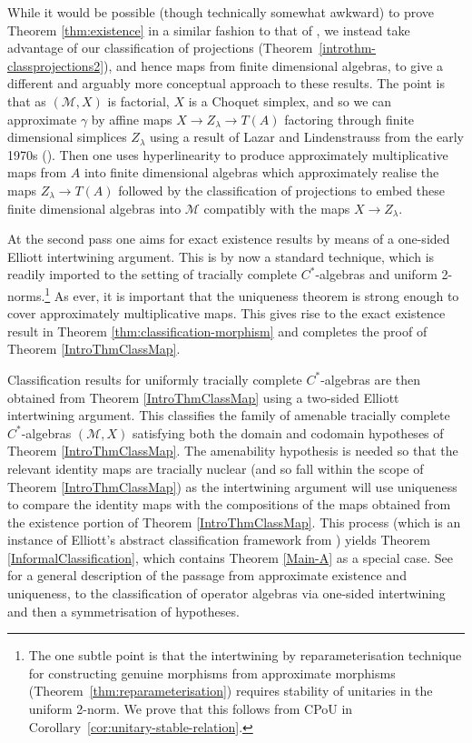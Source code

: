 \documentclass[a4paper,11pt]{amsart}
\theoremstyle{definition}
\numberwithin{equation}{section}
\numberwithin{theorem}{section}
\newcommand{\M}{\mathcal{M}}
\begin{document}
While it would be possible (though technically somewhat awkward) to prove Theorem \ref{thm:existence} in a similar fashion to that of \cite[Theorem 2.6]{CETW-classification}, we instead take advantage of our classification of projections (Theorem~\ref{introthm-classprojections2}), and hence maps from finite dimensional algebras, 
to give a different and arguably more conceptual approach to these results.  The point is that as $(\M,X)$ is factorial, $X$ is a Choquet simplex, and so we can approximate $\gamma$ by affine maps $X\to Z_\lambda \to T(A)$ factoring through finite dimensional simplices $Z_\lambda$ using a result of Lazar and Lindenstrauss from the early 1970s (\cite{Lazar-Lindenstrauss71}).  Then one uses hyperlinearity to produce approximately multiplicative maps from $A$ into finite dimensional algebras which approximately realise the maps $Z_\lambda \to T(A)$ followed by the classification of projections to embed these finite dimensional algebras into $\M$ compatibly with the maps $X\to Z_\lambda$. 

At the second pass one aims for exact existence results by means of a one-sided Elliott intertwining argument. This is by now a standard technique, which is readily imported to the setting of tracially complete $C^*$-algebras and uniform 2-norms.\footnote{The one subtle point is that the intertwining by reparameterisation technique for constructing genuine morphisms from approximate morphisms (Theorem~\ref{thm:reparameterisation}) requires stability of unitaries in the uniform 2-norm.  We prove that this follows from CPoU in Corollary~\ref{cor:unitary-stable-relation}.} As ever, it is important that the uniqueness theorem is strong enough to cover approximately multiplicative maps. This gives rise to the exact existence result in Theorem \ref{thm:classification-morphism} and completes the proof of Theorem \ref{IntroThmClassMap}.

Classification results for uniformly tracially complete $C^*$-algebras are then obtained from Theorem \ref{IntroThmClassMap} using a two-sided Elliott intertwining argument. This classifies the family of amenable tracially complete $C^*$-algebras $(\mathcal M,X)$ satisfying both the domain and codomain hypotheses of Theorem \ref{IntroThmClassMap}. The amenability hypothesis is needed so that the relevant identity maps are tracially nuclear (and so fall within the scope of Theorem \ref{IntroThmClassMap}) as the intertwining argument will use uniqueness to compare the identity maps with the compositions of the maps obtained from the existence portion of Theorem \ref{IntroThmClassMap}.  This process (which is an instance of Elliott's abstract classification framework from \cite{El09}) yields Theorem \ref{InformalClassification}, which contains Theorem \ref{Main-A} as a special case.  See \cite[Section 6]{White:ICM} for a general description of the passage from approximate existence and uniqueness, to the classification of operator algebras via one-sided intertwining and then a symmetrisation of hypotheses.
\end{document}
